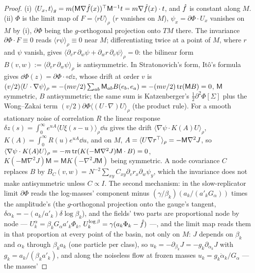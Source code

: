 \begin{proof}
(i) $\langle U_x,t\rangle_g = m(\mathsf M\nabla\hat f(x))^\top\mathsf M^{-1}t = m\nabla\hat f(x)\cdot t$, and $\hat f$ is
constant along $M$. (ii) $\Phi$ is the limit map of $F = \langle rU\rangle_\rho$ ($r$ vanishes on $M$),
$\psi_x = \partial\Phi\cdot U_x$ vanishes on $M$ by (i), $\partial\Phi$ being the $g$-orthogonal projection onto $TM$
there. The invariance $\partial\Phi\cdot F\equiv0$ reads $\langle r\psi\rangle_\rho\equiv0$ near $M$; differentiating
twice at a point of $M$, where $r$ and $\psi$ vanish, gives
$\langle\partial_vr\,\partial_w\psi + \partial_wr\,\partial_v\psi\rangle_\rho = 0$: the bilinear form
$B(v,w) := \langle\partial_vr\,\partial_w\psi\rangle_\rho$ is antisymmetric. In Stratonovich's form, It\^o's formula
gives $\dd\Phi(z) = \partial\Phi\cdot{\circ}\dd z$, whose drift at order $v$ is
$(v/2)\langle U\cdot\nabla\psi\rangle_\rho = -(mv/2)\sum_{ab}\mathsf M_{ab}B(e_b,e_a) = -(mv/2)\operatorname{tr}(\mathsf MB) = 0$,
$\mathsf M$ symmetric, $B$ antisymmetric; the same sum is Katzenberger's $\tfrac12\partial^2\Phi[\Sigma]$ plus the
Wong--Zakai term $(v/2)\partial\Phi\langle(U\cdot\nabla)U\rangle_\rho$ (the product rule). For a smooth stationary noise
of correlation $R$ the linear response $\delta z(s) = \int_0^\infty e^{uA}\langle U\xi(s - u)\rangle_\rho\dd u$ gives the
drift $\langle\nabla\psi\cdot K(A)U\rangle_\rho$, $K(A) = \int_0^\infty R(u)e^{uA}\dd u$, and on $M$,
$A = \langle U\nabla r^\top\rangle_\rho = -\mathsf M\nabla^2J$, so
$\langle\nabla\psi\cdot K(A)U\rangle_\rho = -m\operatorname{tr}(K(-\mathsf M\nabla^2J)\mathsf M\cdot B) = 0$,
$K(-\mathsf M\nabla^2J)\mathsf M = \mathsf MK(-\nabla^2J\mathsf M)$ being symmetric. A node covariance $C$ replaces $B$
by $B_C(v,w) = N^{-2}\sum_{xy}C_{xy}\partial_vr_x\partial_w\psi_y$, which the invariance does not make antisymmetric
unless $C\propto I$. The second mechanism: in the slow-replicator limit $\partial\Phi$ reads the log-masses' component
minus $(\gamma/\beta_k)(a_k/(a'_kG_\alpha))$ times the amplitude's (the $g$-orthogonal projection onto the gauge's
tangent, $\delta\alpha_k = -(a_k/a'_k)\delta\log\beta_k$), and the fields' two parts are proportional node by node ---
$U^\alpha_k = \beta_kG_\alpha a'_k\Phi_k$, $U^{\log\beta}_k = \gamma(a_k\Phi_k - \hat f)$ ---, and the limit map reads
them in that proportion at every point of the basin, not only on $M$: $J$ depends on $\beta_k$ and $\alpha_k$ through
$\beta_ka_k$ (one particle per class), so $u_k = -\partial_{\beta_k}J = -g_k\partial_{\alpha_k}J$ with
$g_k = a_k/(\beta_ka'_k)$, and along the noiseless flow at frozen masses $u_k = g_k\dot\alpha_k/G_\alpha$ --- the masses'

\end{proof}
